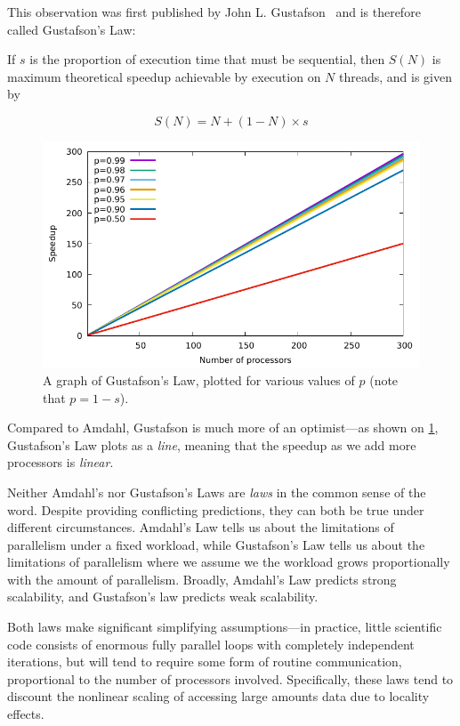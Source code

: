 This observation was first published by John
L. Gustafson~\cite{10.1145/42411.42415} and is therefore called
Gustafson's Law:

\begin{definition}\label{gustafson}
  If $s$ is the proportion of execution time that must be sequential,
  then $S(N)$ is maximum theoretical speedup achievable by execution
  on $N$ threads, and is given by

  \[
    S(N) = N + (1-N) \times s
  \]
\end{definition}

\begin{figure}
  \centering
  \includegraphics[width=\textwidth]{img/gustafson.pdf}
  \caption{A graph of Gustafson's Law, plotted for various values of
    $p$ (note that $p=1-s$).}
  \label{fig:gustafson}
\end{figure}

Compared to Amdahl, Gustafson is much more of an optimist---as shown
on \cref{fig:gustafson}, Gustafson's Law plots as a \textit{line},
meaning that the speedup as we add more processors is \textit{linear}.

Neither Amdahl's nor Gustafson's Laws are \emph{laws} in the common
sense of the word.  Despite providing conflicting predictions, they
can both be true under different circumstances.  Amdahl's Law tells us
about the limitations of parallelism under a fixed workload, while
Gustafson's Law tells us about the limitations of parallelism where we
assume we the workload grows proportionally with the amount of
parallelism.  Broadly, Amdahl's Law predicts strong scalability, and
Gustafson's law predicts weak scalability.

Both laws make significant simplifying assumptions---in practice,
little scientific code consists of enormous fully parallel loops with
completely independent iterations, but will tend to require some form
of routine communication, proportional to the number of processors
involved.  Specifically, these laws tend to discount the nonlinear
scaling of accessing large amounts data due to locality effects.

